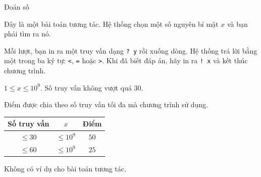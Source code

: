 \documentclass[11pt, a4paper, oneside]{article}
\begin{document}
\begin{problem}[
  input = stdin, output = stdout,
  time  = 1, memory = 256, points = 50,
]{Đoán số}

Đây là một bài toán tương tác. Hệ thống chọn một số nguyên bí mật $x$ và bạn
phải tìm ra nó.

\Interaction
Mỗi lượt, bạn in ra một truy vấn dạng \texttt{? y} rồi xuống dòng. Hệ thống
trả lời bằng một trong ba ký tự: \texttt{<}, \texttt{=} hoặc \texttt{>}. Khi
đã biết đáp án, hãy in ra \texttt{! x} và kết thúc chương trình.

\Constraints
$1 \le x \le 10^9$. Số truy vấn không vượt quá $30$.

\Scoring
Điểm được chia theo số truy vấn tối đa mà chương trình sử dụng.

\begin{center}
  \begin{tabular}{c c c}
    \hline
    Số truy vấn & $x$ & Điểm \\
    \hline
    $\le 30$ & $\le 10^9$ & $50$ \\
    $\le 60$ & $\le 10^9$ & $25$ \\
    \hline
  \end{tabular}
\end{center}

\Note
Không có ví dụ cho bài toán tương tác.

\end{problem}
\end{document}
